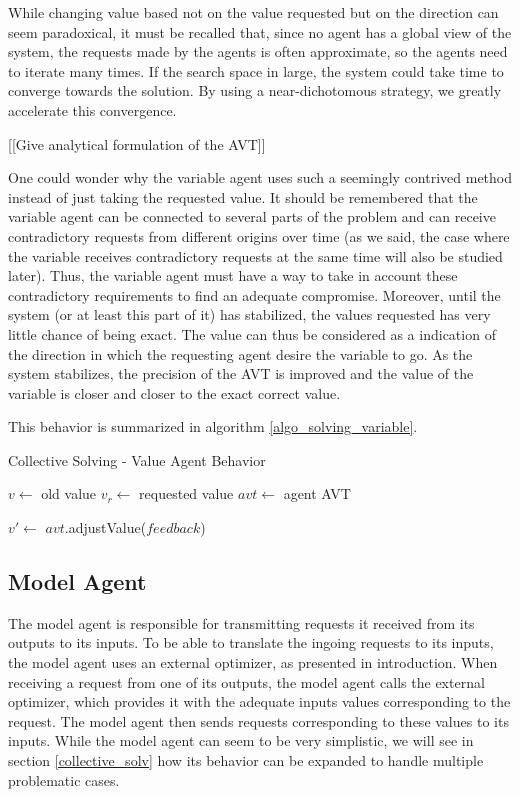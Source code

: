 While changing value based not on the value requested but on the direction can seem paradoxical, it must be recalled that, since no agent has a global view of the system, the requests made by the agents is often approximate, so the agents need to iterate many times. If the search space in large, the system could take time to converge towards the solution. By using a near-dichotomous strategy, we greatly accelerate this convergence.

[[Give analytical formulation of the AVT]]

One could wonder why the variable agent uses such a seemingly contrived method instead of just taking the requested value. It should be remembered that the variable agent can be connected to several parts of the problem and can receive contradictory requests from different origins over time (as we said, the case where the variable receives contradictory requests at the same time will also be studied later). Thus, the variable agent must have a way to take in account these contradictory requirements to find an adequate compromise. Moreover, until the system (or at least this part of it) has stabilized, the values requested has very little chance of being exact. The value can thus be considered as a  indication of the direction in which the requesting agent desire the variable to go. As the system stabilizes, the precision of the AVT is improved and the value of the variable is closer and closer to the exact correct value.

This behavior is summarized in algorithm \ref{algo_solving_variable}.

\begin{algorithm}
\caption{Collective Solving - Value Agent Behavior}
\label{algo_solving_variable}

	$v \leftarrow$ old value\;
	$v_r \leftarrow$ requested value\;
	$avt \leftarrow$ agent AVT \;
	
	$v' \leftarrow$ $avt$.adjustValue($feedback$)\;
	
\end{algorithm}

\subsection{Model Agent}\label{model_agent_solving}

The model agent is responsible for transmitting requests it received from its outputs to its inputs. To be able to translate the ingoing requests to its inputs, the model agent uses an external optimizer, as presented in introduction. When receiving a request from one of its outputs, the model agent calls the external optimizer, which provides it with the adequate inputs values corresponding to the request. The model agent then sends requests corresponding to these values to its inputs.
While the model agent can seem to be very simplistic, we will see in section \ref{collective_solv} how its 
behavior can be expanded to handle multiple problematic cases.

